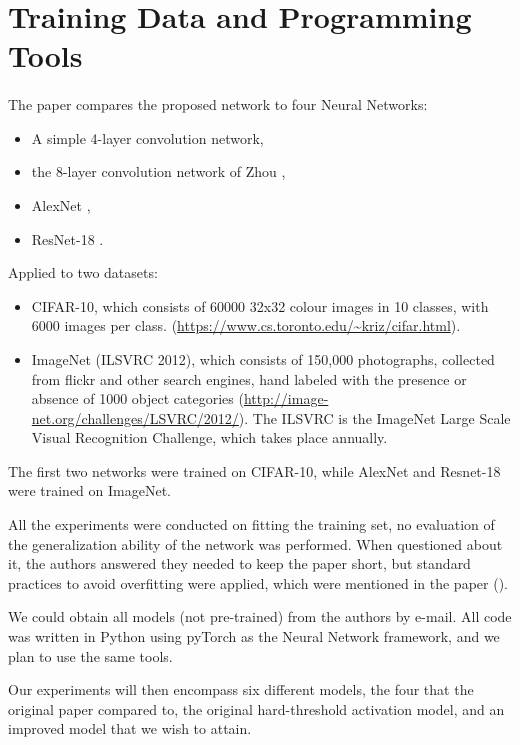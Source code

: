 \section{Training Data and Programming Tools}\label{tools}
\paragraph{}
The paper compares the proposed network to four Neural Networks:

\begin{itemize}
\item A simple 4-layer convolution network,
\item the 8-layer convolution network of Zhou \cite{zhou2016dorefa},
\item AlexNet \cite{alexnet},
\item ResNet-18 \cite{resnet18}.
\end{itemize}

Applied to two datasets:

\begin{itemize}
\item CIFAR-10, which consists of 60000 32x32 colour images in 10 classes, with 6000 images per class. (\url{https://www.cs.toronto.edu/~kriz/cifar.html}).
\item ImageNet (ILSVRC 2012), which consists of 150,000 photographs, collected from flickr and other search engines, hand labeled with the presence or absence of 1000 object categories (\url{http://image-net.org/challenges/LSVRC/2012/}). The ILSVRC is the ImageNet Large Scale Visual Recognition Challenge, which takes place annually.
\end{itemize}

The first two networks were trained on CIFAR-10, while AlexNet and Resnet-18 were trained on ImageNet. 

All the experiments were conducted on fitting the training set, no evaluation of the generalization ability of the network was performed. When questioned about it, the authors answered they needed to keep the paper short, but standard practices to avoid overfitting were applied, which were mentioned in the paper (\cite{FriesenReview}).

We could obtain all models (not pre-trained) from the authors by e-mail. All code was written in Python using pyTorch as the Neural Network framework, and we plan to use the same tools.

Our experiments will then encompass six different models, the four that the original paper compared to, the original hard-threshold activation model, and an improved model that we wish to attain.
